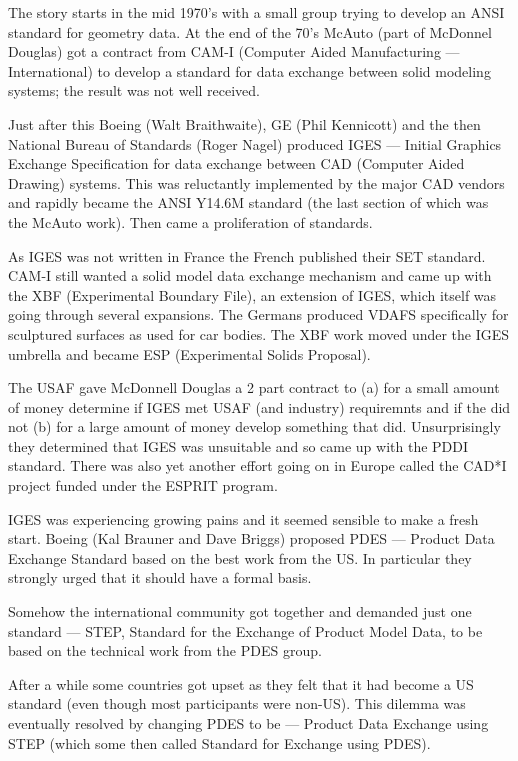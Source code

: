\begin{remarks}
\remintro


\normalsize

The story starts in the mid 1970's with a small group trying to develop
an ANSI standard for geometry data. At the end of the 70's McAuto (part
of McDonnel Douglas) got a contract from CAM-I (Computer Aided Manufacturing
--- International) to develop a standard for data exchange between solid 
modeling systems; the result was not well received.

    Just after this Boeing (Walt Braithwaite), GE (Phil Kennicott) and
the then National Bureau of Standards (Roger Nagel) produced IGES ---
Initial Graphics Exchange Specification for data exchange between CAD 
(Computer Aided Drawing) systems. This was reluctantly implemented by the
major CAD vendors and rapidly became the ANSI Y14.6M standard (the last
section of which was the McAuto work). Then came a proliferation of standards.

    As IGES was not written in France the French published their SET standard.
CAM-I still wanted a solid model data exchange mechanism and came up with
the XBF (Experimental Boundary File), an extension of IGES, which itself 
was going through several 
expansions. The Germans produced VDAFS specifically for sculptured surfaces
as used for car bodies. The XBF work moved under the IGES umbrella and became
ESP (Experimental Solids Proposal).

    The USAF gave McDonnell Douglas a 2 part contract to (a) for a small 
amount of money determine if IGES met USAF (and industry) requiremnts
and if the did not (b) for a large amount of money develop something that did.
Unsurprisingly they determined that IGES was unsuitable and so came up with
the PDDI standard. There was also yet another effort going on in Europe
called the CAD*I project funded under the ESPRIT program.

    IGES was experiencing growing pains and it seemed sensible to make a fresh
start. Boeing (Kal Brauner and Dave Briggs) proposed PDES --- Product Data 
Exchange Standard based on the best work from the US. In particular they
strongly urged that it should have a formal basis.

    Somehow the international community got together and demanded just one
standard --- STEP, Standard for the Exchange of Product Model Data, to be 
based on the technical work from the PDES group. 

    After a while some countries got upset as they felt that it had become a
US standard (even though most participants were non-US). This dilemma was 
eventually resolved by changing PDES to be --- Product Data Exchange using 
STEP (which some then called Standard for Exchange using PDES).

\remend
\end{remarks}

